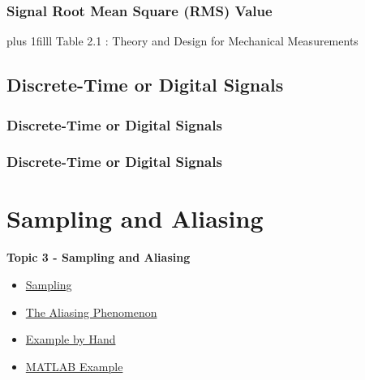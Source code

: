 \documentclass[fleqn]{beamer} %
\newcommand{\sectionIIItitle}{Sampling and Aliasing}
\newcommand{\sectionIIsubsectionIIItitle}{Signal Root Mean Square (RMS) Value}
\newcommand{\sectionIIsubsectionIVtitle}{Discrete-Time or Digital Signals}
\newcommand{\sectionIIIsubsectionItitle}{Sampling}
\newcommand{\sectionIIIsubsectionIItitle}{The Aliasing Phenomenon}
\newcommand{\sectionIIIsubsectionIIItitle}{Example by Hand}
\newcommand{\sectionIIIsubsectionIVtitle}{MATLAB Example}
\newcommand{\btVFill}{\vskip0pt plus 1filll}
\begin{document}
			\begin{frame}
			\frametitle{\sectionIIsubsectionIIItitle}




\btVFill
\tiny{Table 2.1 : Theory and Design for Mechanical Measurements}	



			\end{frame}

		\subsection{\sectionIIsubsectionIVtitle}\label{sectionIIsubsectionIV}

			\begin{frame}
				\frametitle{\sectionIIsubsectionIVtitle}


			\end{frame}

			\begin{frame}
				\frametitle{\sectionIIsubsectionIVtitle}


			\end{frame}
		
	
	\section{\sectionIIItitle}\label{sectionIII}

		\begin{frame}
			\large \textbf{Topic 3 - \sectionIIItitle} \vspace{3mm}\\

			\begin{itemize}
				\item \hyperlink{sectionIIIsubsectionI}{\sectionIIIsubsectionItitle} \vspc %
				\item \hyperlink{sectionIIIsubsectionII}{\sectionIIIsubsectionIItitle} \vspc %
				\item \hyperlink{sectionIIIsubsectionIII}{\sectionIIIsubsectionIIItitle} \vspc %
				\item \hyperlink{sectionIIIsubsectionIV}{\sectionIIIsubsectionIVtitle} \vspc %
			\end{itemize}

		\end{frame}
\end{document}
